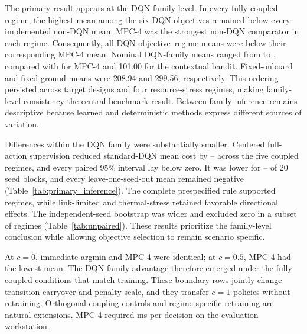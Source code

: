 \documentclass[11pt]{article}
\begin{document}
\begin{table}[H]
\centering
\color{red}%
\caption{Sensitivity of the centered full-action--standard DQN comparison to ignoring the prespecified model-seed matching. The two groups of 20 seed means are resampled independently. These intervals quantify the loss of precision when the common-random-number blocks are discarded and are not the primary analysis.}
\color{black}%
\label{tab:unpaired}
\resizebox{0.80\textwidth}{!}{}
\end{table}

\color{red}%
The primary result appears at the DQN-family level. In every fully coupled regime, the highest mean among the six DQN objectives remained below every implemented non-DQN mean. MPC-4 was the strongest non-DQN comparator in each regime. Consequently, all \DQNFamilyBelowMPCCount{} DQN objective--regime means were below their corresponding MPC-4 mean. Nominal DQN-family means ranged from \DQNFamilyNominalMinCost{} to \DQNFamilyNominalMaxCost, compared with \MPCNominalCost{} for MPC-4 and 101.00 for the contextual bandit. Fixed-onboard and fixed-ground means were 208.94 and 299.56, respectively. This ordering persisted across target designs and four resource-stress regimes, making family-level consistency the central benchmark result. Between-family inference remains descriptive because learned and deterministic methods express different sources of variation.
\color{black}%

\color{red}%
Differences within the DQN family were substantially smaller. Centered full-action supervision reduced standard-DQN mean cost by \PhysicalCBADMinPct--\PhysicalCBADMaxPct{} across the five coupled regimes, and every paired 95\% interval lay below zero. It was lower for \PrimaryNegativeSeedsMin--\PrimaryNegativeSeedsMax{} of 20 seed blocks, and every leave-one-seed-out mean remained negative (Table~\ref{tab:primary_inference}). The complete prespecified rule supported \PrimarySupportedCount{} regimes, while link-limited and thermal-stress retained favorable directional effects. The independent-seed bootstrap was wider and excluded zero in a subset of regimes (Table~\ref{tab:unpaired}). These results prioritize the family-level conclusion while allowing objective selection to remain scenario specific.
\color{black}%

\color{red}%
At $c=0$, immediate argmin and MPC-4 were identical; at $c=0.5$, MPC-4 had the lowest mean. The DQN-family advantage therefore emerged under the fully coupled conditions that match training. These boundary rows jointly change transition carryover and penalty scale, and they transfer $c=1$ policies without retraining. Orthogonal coupling controls and regime-specific retraining are natural extensions. MPC-4 required \MPCNominalPlanningMs{} ms per decision on the evaluation workstation.
\end{document}
